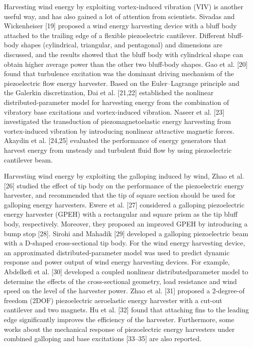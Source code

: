 \documentclass{article}
\begin{document}
Harvesting wind energy by exploiting vortex-induced vibration (VIV) is another useful way, and has also
gained a lot of attention from scientists. Sivadas and Wickenheiser [19] proposed a wind energy harvesting
device with a bluff body attached to the trailing edge of a flexible piezoelectric cantilever. Different bluff-body
shapes (cylindrical, triangular, and pentagonal) and dimensions are discussed, and the results showed that the
bluff body with cylindrical shape can obtain higher average power than the other two bluff-body shapes. Gao et
al. [20] found that turbulence excitation was the dominant driving mechanism of the piezoelectric flow energy
harvester. Based on the Euler–Lagrange principle and the Galerkin discretization, Dai et al. [21,22] established
the nonlinear distributed-parameter model for harvesting energy from the combination of vibratory base excitations and vortex-induced vibration. Naseer et al. [23] investigated the transduction of piezomagnetoelastic
energy harvesting from vortex-induced vibration by introducing nonlinear attractive magnetic forces. Akaydin
et al. [24,25] evaluated the performance of energy generators that harvest energy from unsteady and turbulent
fluid flow by using piezoelectric cantilever beam.

Harvesting wind energy by exploiting the galloping induced by wind, Zhao et al. [26] studied the effect
of tip body on the performance of the piezoelectric energy harvester, and recommended that the tip of square
section should be used for galloping energy harvesters. Ewere et al. [27] considered a galloping piezoelectric
energy harvester (GPEH) with a rectangular and square prism as the tip bluff body, respectively. Moreover,
they proposed an improved GPEH by introducing a bump stop [28]. Sirohi and Mahadik [29] developed a
galloping piezoelectric beam with a D-shaped cross-sectional tip body. For the wind energy harvesting device,
an approximated distributed-parameter model was used to predict dynamic response and power output of
wind energy harvesting devices. For example, Abdelkefi et al. [30] developed a coupled nonlinear distributedparameter model to determine the effects of the cross-sectional geometry, load resistance and wind speed
on the level of the harvester power. Zhao et al. [31] proposed a 2-degree-of freedom (2DOF) piezoelectric
aeroelastic energy harvester with a cut-out cantilever and two magnets. Hu et al. [32] found that attaching
fins to the leading edge significantly improves the efficiency of the harvester. Furthermore, some works about
the mechanical response of piezoelectric energy harvesters under combined galloping and base excitations
[33–35] are also reported.
\end{document}
